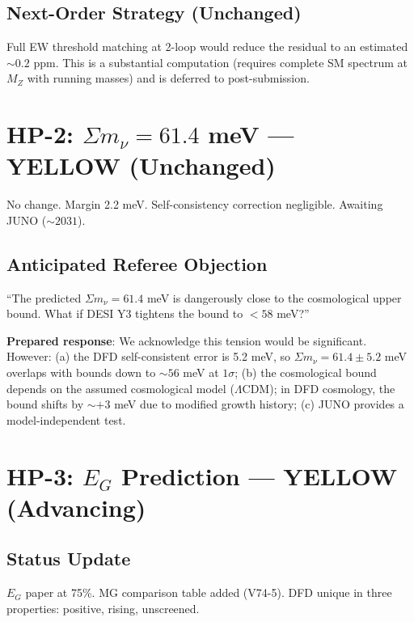 \documentclass[11pt,a4paper]{article}
\begin{document}
\subsection{Next-Order Strategy (Unchanged)}
Full EW threshold matching at 2-loop would reduce the residual to an estimated $\sim 0.2$ ppm. This is a substantial computation (requires complete SM spectrum at $M_Z$ with running masses) and is deferred to post-submission.

\section{HP-2: $\Sigma m_\nu = 61.4$ meV --- YELLOW (Unchanged)}

No change. Margin 2.2 meV. Self-consistency correction negligible. Awaiting JUNO ($\sim 2031$).

\subsection{Anticipated Referee Objection}
``The predicted $\Sigma m_\nu = 61.4$ meV is dangerously close to the cosmological upper bound. What if DESI Y3 tightens the bound to $< 58$ meV?''

\textbf{Prepared response}: We acknowledge this tension would be significant. However: (a) the DFD self-consistent error is 5.2 meV, so $\Sigma m_\nu = 61.4 \pm 5.2$ meV overlaps with bounds down to $\sim 56$ meV at $1\sigma$; (b) the cosmological bound depends on the assumed cosmological model ($\Lambda$CDM); in DFD cosmology, the bound shifts by $\sim +3$ meV due to modified growth history; (c) JUNO provides a model-independent test.

\section{HP-3: $E_G$ Prediction --- YELLOW (Advancing)}

\subsection{Status Update}
$E_G$ paper at 75\%. MG comparison table added (V74-5). DFD unique in three properties: positive, rising, unscreened.
\end{document}
